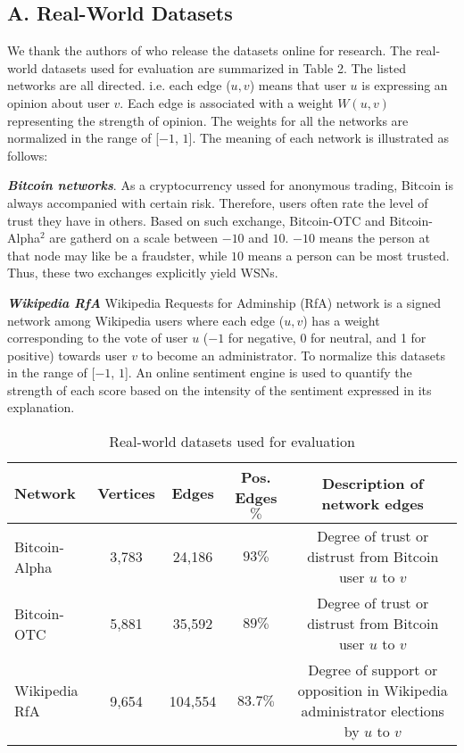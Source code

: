
\subsection*{A. Real-World Datasets}
We thank the authors of \cite{} who release the datasets online for research.
The real-world datasets used for evaluation are summarized in Table 2.
The listed networks are all directed. i.e. each edge ($u,v$) means that user
$u$ is expressing an opinion about user $v$. Each edge is associated with a
weight $W(u,v)$ representing the strength of opinion. The weights for all 
the networks are normalized in the range of [$-1$, $1$]. The meaning 
of each network is illustrated as follows:

\emph{\textbf{Bitcoin networks}}. As a cryptocurrency ussed for 
anonymous trading, Bitcoin is always accompanied with certain risk.
Therefore, users often rate the level of trust they have in others.
Based on such exchange, Bitcoin-OTC and Bitcoin-Alpha$^2$ are gatherd
on a scale between $-10$ and $10$. $-10$ means the person at that node 
may like be a fraudster, while $10$ means a person can be most trusted.
Thus, these two exchanges explicitly yield WSNs.

\emph{\textbf{Wikipedia RfA}} Wikipedia Requests for Adminship (RfA) 
network is a signed network among Wikipedia users where each 
edge ($u,v$) has a weight corresponding to the vote of user $u$
($-1$ for negative, 0 for neutral, and 1 for positive) towards user 
$v$ to become an administrator. To normalize this datasets in the
range of [$-1$, $1$]. An online sentiment engine is used to quantify
the strength of each score based on the intensity of the sentiment expressed 
in its explanation.

\begin{table}[htbp]
\centering
\caption{Real-world datasets used for evaluation}
  \begin{tabular}{l|c|c|c|c}
  \toprule
  \textbf{Network}& \textbf{Vertices} & \textbf{Edges} & \textbf{Pos. Edges $\%$} & \textbf{Description of network edges} \\ \hline
  Bitcoin-Alpha         & 3,783 & 24,186 & $93\%$  & Degree of trust or distrust from Bitcoin user $u$ to $v$ \\ \hline
  Bitcoin-OTC           & 5,881 & 35,592 & $89\%$  & Degree of trust or distrust from Bitcoin user $u$ to $v$ \\ \hline
  Wikipedia RfA         & 9,654 & 104,554 & $83.7\%$  & Degree of support or opposition in Wikipedia administrator elections by $u$ to $v$ \\ \hline
  \end{tabular}
\end{table}

